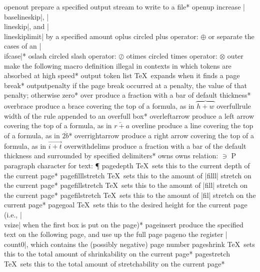 \capcs openout {prepare a specified output stream to write to a file}*{}
\capcs openup {increase |\\baselineskip|, |\\lineskip|, and
   |\\lineskiplimit| by a specified amount}{}{}
\capcs oplus {circled plus operator: $\oplus$}{}{}
\capcs or {separate the cases of an |\\ifcase|}*{\@or}
\capcs oslash {circled slash operator: $\oslash$}{}{}
\capcs otimes {circled times operator: $\otimes$}{}{}
\capcs outer {make the following macro definition illegal in contexts in
   which tokens are absorbed at high speed}*{}
\capcs output {token list \TeX\ expands when it finds a page break}*{}
\capcs outputpenalty {if the page break occurred at a penalty, the value
   of that penalty; otherwise zero}*{}
\capcs over {produce a fraction with a bar of default thickness}*{}
\capcs overbrace {produce a brace covering the top of a formula,
   as in $\overbrace{h+w}{}$}{}{}
\capcs overfullrule {width of the rule appended to an overfull box}*{}
\capcs overleftarrow {produce a left arrow covering the top of
   a formula, as in $\overleftarrow{r+a}$}{}{}
\capcs overline {produce a line covering the top of a formula,
   as in $\overline{2b}$}*{}
\capcs overrightarrow {produce a right arrow covering the top of a 
   formula, as in $\overrightarrow{i+t}$}{}{}
\capcs overwithdelims {produce a fraction with a bar of the default thickness 
   and surrounded by specified delimiters}*{}
\capcs owns {owns relation: $\owns$}{}{}
\capcs P {paragraph character for text: \P}{}{}
\capcs pagedepth {\TeX\ sets this to the current depth of the current
   page}*{}
\capcs pagefilllstretch {\TeX\ sets this to the amount of |filll| stretch on
   the current page}*{}
\capcs pagefillstretch {\TeX\ sets this to the amount of |fill| stretch on 
   the current page}*{}
\capcs pagefilstretch {\TeX\ sets this to the amount of |fil| stretch on the
   current page}*{}
\capcs pagegoal {\TeX\ sets this to the desired height for the current page
   (i.e., |\\vsize| when the first box is put on the page)}*{}
\capcs pageinsert {produce the specified text on the following page, and use up
    the full page}{}{}
\capcs pageno {the register |\\count0|, which contains the
   (possibly negative) page number}{}{}
\capcs pageshrink {\TeX\ sets this to the total amount of shrinkability
   on the current page}*{}
\capcs pagestretch {\TeX\ sets this to the total amount of stretchability
   on the current page}*{}
